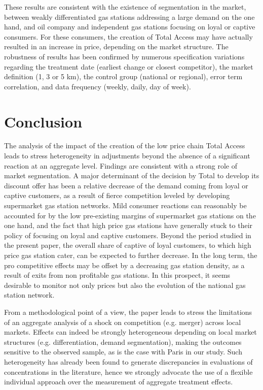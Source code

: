 \documentclass[english]{article}
\begin{document}
These results are consistent with the existence of segmentation in the market, between weakly differentiated gas stations addressing a large demand on the one hand, and oil company and independent gas stations focusing on loyal or captive consumers. For these consumers, the creation of Total Access may have actually resulted in an increase in price, depending on the market structure. The robustness of results has been confirmed by numerous specification variations regarding the treatment date (earliest change or closest competitor), the market definition (1, 3 or 5 km), the control group (national or regional), error term correlation, and data frequency (weekly, daily, day of week).

\section{Conclusion}

The analysis of the impact of the creation of the low price chain Total Access leads to stress heterogeneity in adjustments beyond the absence of a significant reaction at an aggregate level. Findings are consistent with a strong role of market segmentation. A major determinant of the decision by Total to develop its discount offer has been a relative decrease of the demand coming from loyal or captive customers, as a result of fierce competition leveled by developing supermarket gas station networks. Mild consumer reactions can reasonably be accounted for by the low pre-existing margins of supermarket gas stations on the one hand, and the fact that high price gas stations have generally stuck to their policy of focusing on loyal and captive customers.
Beyond the period studied in the present paper, the overall share of captive of loyal customers, to which high price gas station cater, can be expected to further decrease. In the long term, the pro competitive effects may be offset by a decreasing gas station density, as a result of exits from non profitable gas stations. In this prospect, it seems desirable to monitor not only prices but also the evolution of the national gas station network.\medskip{}

From a methodological point of a view, the paper leads to stress the limitations of an aggregate analysis of a shock on competition (e.g. merger) across local markets. Effects can indeed be strongly heterogeneous depending on local market structures (e.g. differentiation, demand segmentation), making the outcomes sensitive to the observed sample, as is the case with Paris in our study. Such heterogeneity has already been found to generate discrepancies in evaluations of concentrations in the literature, hence we strongly advocate the use of a flexible individual approach over the measurement of aggregate treatment effects.
\end{document}
